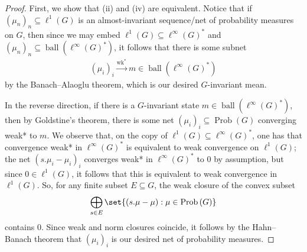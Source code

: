 \documentclass[10pt]{mypackage}
\begin{document}
\begin{proof}
  First, we show that (ii) and (iv) are equivalent. Notice that if $\left( \mu_n \right)_n\subseteq \ell^1\left( G \right)$ is an almost-invariant sequence/net of probability measures on $G$, then since we may embed $\ell^1\left( G \right)\subseteq \ell^{\infty}\left( G \right)^{\ast}$ and $\left( \mu_n \right)_n\subseteq \operatorname{ball}\left( \ell^{\infty}\left( G \right)^{\ast} \right)$, it follows that there is some subnet 
  \begin{align*}
    \left( \mu_i \right)_{i}\xrightarrow{\operatorname{wk}^{\ast}} m\in \operatorname{ball}\left( \ell^{\infty}\left( G \right)^{\ast} \right)
  \end{align*}
  by the Banach--Alaoglu theorem, which is our desired $G$-invariant mean.

  In the reverse direction, if there is a $G$-invariant state $m\in \operatorname{ball}\left( \ell^{\infty}\left( G \right)^{\ast} \right)$, then by Goldstine's theorem, there is some net $\left( \mu_i \right)_{i}\subseteq \operatorname{Prob}\left( G \right)$ converging weak* to $m$. We observe that, on the copy of $\ell^1\left( G \right)\subseteq \ell^{\infty}\left( G \right)^{\ast}$, one has that convergence weak* in $\ell^{\infty}\left( G \right)^{\ast}$ is equivalent to weak convergence on $\ell^1\left( G \right)$; the net $\left( s.\mu_i-\mu_i \right)_{i}$ converges weak* in $\ell^{\infty}\left( G \right)^{\ast}$ to $0$ by assumption, but since $0\in \ell^1\left( G \right)$, it follows that this is equivalent to weak convergence in $\ell^1\left( G \right)$. So, for any finite subset $E\subseteq G$, the weak closure of the convex subset
  \begin{align*}
    \bigoplus_{s\in E} \set{\left( s.\mu-\mu \right) : \mu\in \operatorname{Prob}\left( G \right)}
  \end{align*}
  contains $0$. Since weak and norm closures coincide, it follows by the Hahn--Banach theorem that $\left( \mu_i \right)_{i}$ is our desired net of probability measures.


\end{proof}
\end{document}
